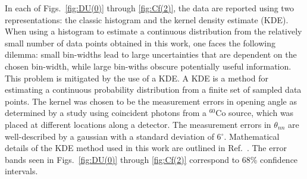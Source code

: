 In each of Figs.~\ref{fig:DU(0)} through \ref{fig:Cf(2)}, the data are reported using two representations: the classic histogram and the kernel density estimate (KDE).
When using a histogram to estimate a continuous distribution from the relatively small number of data points obtained in this work, one faces the following dilemma: small bin-widths lead to large uncertainties that are dependent on the chosen bin-width, while large bin-withs obscure potentially useful information. 
This problem is mitigated by the use of a KDE.
A KDE is a method for estimating a continuous probability distribution from a finite set of sampled data points.
The kernel was chosen to be the measurement errors in opening angle as determined by a study using coincident photons from a $^{60}$Co source, which was placed at different locations along a detector.
The measurement errors in $\theta_{nn}$ are well-described by a gaussian with a standard deviation of 6$^{\circ}$.
Mathematical details of the KDE method used in this work are outlined in Ref.~\cite{KDE}.
The error bands seen in Figs.~\ref{fig:DU(0)} through \ref{fig:Cf(2)} correspond to 68\% confidence intervals.

